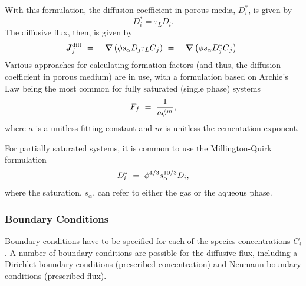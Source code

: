 With this formulation, the diffusion coefficient in porous media, $D_{i}^{*}$, is given by
\begin{equation} \label{eq:EffectiveDiffusion)} 
  D_{i}^{*} =\tau_{L} D_{i}.  
\end{equation} 
The diffusive flux, then, is given by
\begin{equation} \label{eq:DiffusiveFluxPorousMedia)} 
  \boldsymbol{J}_{j}^{\rm diff} 
  \ =\  
  -\boldsymbol{\nabla} \left( \phi s_{\alpha} D_{j} \tau_{L} C{}_{j} \right) 
  \ =\  
  -\boldsymbol{\nabla} \left( \phi s_{\alpha} D_{j}^{*} C{}_{j} \right) .  
\end{equation} 
Various approaches for calculating formation factors (and thus, the diffusion coefficient in porous medium) are in use, 
with a formulation based on Archie's Law being the most common for fully saturated (single phase) systems
\begin{equation} \label{eq:CementationExponent} 
  F_f  \ =\  \frac{1}{a\phi ^{m} } ,  
\end{equation} 
where $a$ is a unitless fitting constant and $m$ is unitless the cementation exponent.  

For partially saturated systems, it is common to use the Millington-Quirk formulation 
\citep{millington1961permeability, sumner-handbook, moldrup2000predicting}
\begin{equation}   \label{eq:MillingtonQuirk}
  D_{i}^{*} \ =\  \phi^{4/3} s_{\alpha}^{10/3}  D_{i},
\end{equation}
where the saturation, $s_{\alpha}$, can refer to either the gas or the aqueous phase.




\subsubsection{Boundary Conditions} 
\label{sec:transport-boundary-conditions}

\noindent 
Boundary conditions have to be specified for each of the species concentrations $C_i$.
A number of boundary conditions are possible for the diffusive flux, 
including a Dirichlet boundary conditions (prescribed concentration) 
and Neumann boundary conditions (prescribed flux). 

